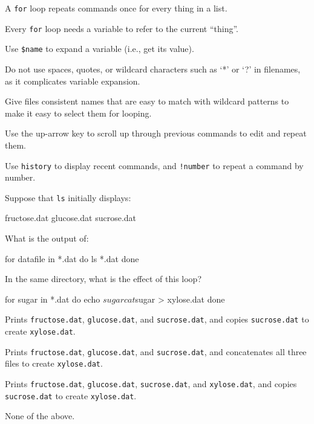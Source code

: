 \begin{keypoints}
\begin{swcitemize}
\item
  A \texttt{for} loop repeats commands once for every thing in a list.
\item
  Every \texttt{for} loop needs a variable to refer to the current
  ``thing''.
\item
  Use \texttt{\$name} to expand a variable (i.e., get its value).
\item
  Do not use spaces, quotes, or wildcard characters such as `*' or `?'
  in filenames, as it complicates variable expansion.
\item
  Give files consistent names that are easy to match with wildcard
  patterns to make it easy to select them for looping.
\item
  Use the up-arrow key to scroll up through previous commands to edit
  and repeat them.
\item
  Use \texttt{history} to display recent commands, and \texttt{!number}
  to repeat a command by number.
\end{swcitemize}
\end{keypoints}

\begin{challenge}
  Suppose that \texttt{ls} initially displays:

\begin{VerbOut}
fructose.dat    glucose.dat   sucrose.dat
\end{VerbOut}

  What is the output of:

\begin{VerbIn}
for datafile in *.dat
do
    ls *.dat
done
\end{VerbIn}
\end{challenge}

\begin{challenge}
  In the same directory, what is the effect of this loop?

\begin{VerbIn}
for sugar in *.dat
do
    echo $sugar
    cat $sugar > xylose.dat
done
\end{VerbIn}

  \begin{swcenumerate}
  \item
    Prints \texttt{fructose.dat}, \texttt{glucose.dat}, and
    \texttt{sucrose.dat}, and copies \texttt{sucrose.dat} to create
    \texttt{xylose.dat}.
  \item
    Prints \texttt{fructose.dat}, \texttt{glucose.dat}, and
    \texttt{sucrose.dat}, and concatenates all three files to create
    \texttt{xylose.dat}.
  \item
    Prints \texttt{fructose.dat}, \texttt{glucose.dat},
    \texttt{sucrose.dat}, and \texttt{xylose.dat}, and copies
    \texttt{sucrose.dat} to create \texttt{xylose.dat}.
  \item
    None of the above.
  \end{swcenumerate}
\end{challenge}

